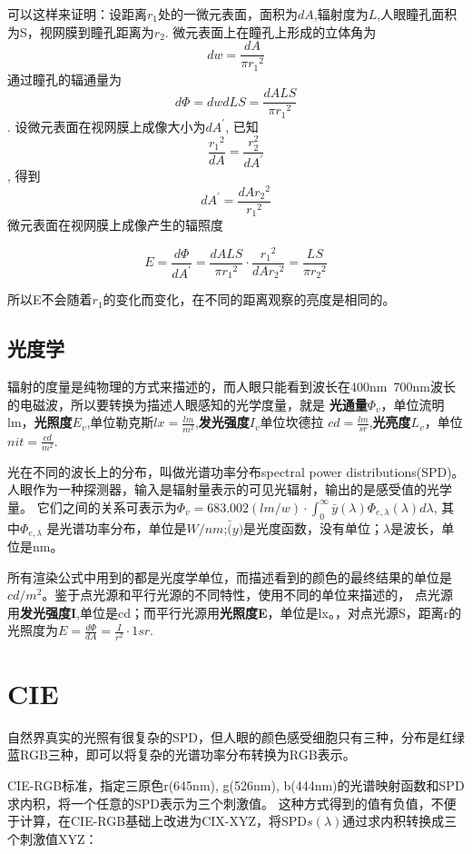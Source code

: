 可以这样来证明：设距离$r_{1}$处的一微元表面，面积为$dA$,辐射度为$L$,人眼瞳孔面积为S，视网膜到瞳孔距离为$r_{2}$.
微元表面上在瞳孔上形成的立体角为
$$dw=\frac{dA}{\pi {r_{1}}^{2}}$$
通过瞳孔的辐通量为
$$d\Phi=dwdLS=\frac{dALS}{\pi {r_{1}}^{2}}$$.
设微元表面在视网膜上成像大小为$dA^{'}$,
已知
$$\frac{{r_{1}}^2}{dA}=\frac{r_{2}^2}{dA^{'}}$$,
得到
$$dA^{'}=\frac{dA{r_{2}}^2}{{r_{1}}^2}$$
微元表面在视网膜上成像产生的辐照度

$$
E=\frac{d\Phi}{dA^{'}}=\frac{dALS}{\pi {r_{1}}^2} \cdot \frac{{r_{1}}^2}{dA{r_{2}}^2}=\frac{LS}{\pi {r_{2}}^2}
$$

所以E不会随着$r_{1}$的变化而变化，在不同的距离观察的亮度是相同的。


\subsection{光度学}

辐射的度量是纯物理的方式来描述的，而人眼只能看到波长在400nm~700nm波长的电磁波，所以要转换为描述人眼感知的光学度量，就是
\textbf{光通量}$\Phi_{v}$，单位流明lm，\textbf{光照度}$E_{v}$,单位勒克斯$lx=\frac{lm}{m^2}$,\textbf{发光强度}$I_{v}$单位坎德拉
$cd=\frac{lm}{sr}$,\textbf{光亮度}$L_{v}$，单位$nit=\frac{cd}{m^2}$.

光在不同的波长上的分布，叫做光谱功率分布spectral power distributions(SPD)。人眼作为一种探测器，输入是辐射量表示的可见光辐射，输出的是感受值的光学量。
它们之间的关系可表示为$\Phi_{v}=683.002(lm/w) \cdot \int_{0}^{\infty}{\bar{y}(\lambda)\Phi_{e,\lambda}(\lambda)d\lambda}$, 其中$\Phi_{e,\lambda}$
是光谱功率分布，单位是$W/nm$;$\bar(y)$是光度函数，没有单位；$\lambda$是波长，单位是nm。

所有渲染公式中用到的都是光度学单位，而描述看到的颜色的最终结果的单位是$cd/m^2$。鉴于点光源和平行光源的不同特性，使用不同的单位来描述的，
点光源用\textbf{发光强度I},单位是cd；而平行光源用\textbf{光照度E}，单位是lx。，对点光源S，距离r的光照度为$E=\frac{d\Phi}{dA}=\frac{I}{r^2} \cdot 1sr$.

\section{CIE}

自然界真实的光照有很复杂的SPD，但人眼的颜色感受细胞只有三种，分布是红绿蓝RGB三种，即可以将复杂的光谱功率分布转换为RGB表示。

CIE-RGB标准，指定三原色r(645nm), g(526nm), b(444nm)的光谱映射函数和SPD求内积，将一个任意的SPD表示为三个刺激值。
这种方式得到的值有负值，不便于计算，在CIE-RGB基础上改进为CIX-XYZ，将SPD$s(\lambda)$通过求内积转换成三个刺激值XYZ：

